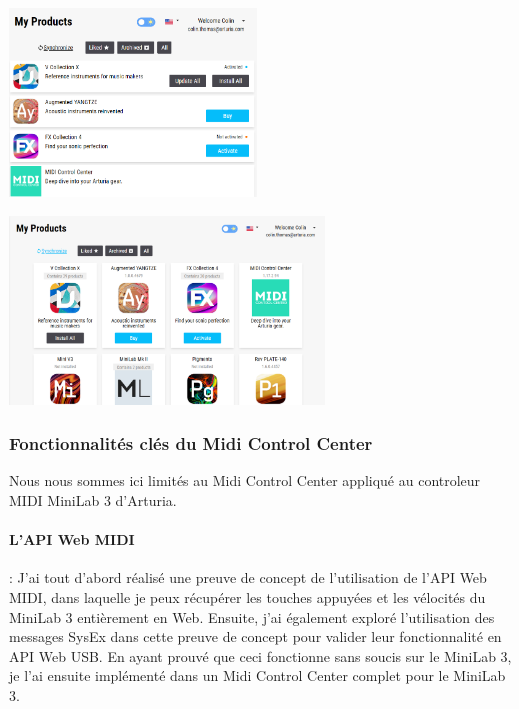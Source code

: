 \documentclass[francais]{rapportPFE}  %
\begin{document}
\begin{center}
    \centering
    \begin{minipage}{.5\textwidth}
    \centering
    \includegraphics[height=5cm]{graphics/small.png}
    \label{fig:test1}
    \end{minipage}%
    \begin{minipage}{.5\textwidth}
    \centering
    \includegraphics[height=5cm]{graphics/big.png}
    \label{fig:test2}
    \end{minipage}
\end{center}


\subsubsection{Fonctionnalités clés du Midi Control Center}

Nous nous sommes ici limités au Midi Control Center appliqué au controleur MIDI MiniLab 3 d'Arturia.

\paragraph{L'API Web MIDI}:
J'ai tout d'abord réalisé une preuve de concept de l'utilisation de l'API Web MIDI, dans laquelle je peux récupérer les touches appuyées et les vélocités du MiniLab 3 entièrement en Web. Ensuite, j'ai également exploré l'utilisation des messages SysEx dans cette preuve de concept pour valider leur fonctionnalité en API Web USB.
En ayant prouvé que ceci fonctionne sans soucis sur le MiniLab 3, je l'ai ensuite implémenté dans un Midi Control Center complet pour le MiniLab 3. 
\end{document}
